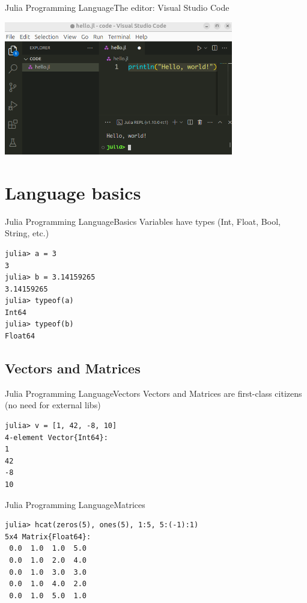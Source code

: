 \documentclass[11pt]{beamer}
\begin{document}
\begin{frame}[fragile]{Julia Programming Language}{The editor: Visual Studio Code}
	\begin{center}
		\includegraphics[width=10cm]{images/vscode.png}
	\end{center}
\end{frame}

\section{Language basics}
\begin{frame}[fragile]{Julia Programming Language}{Basics}
Variables have types (Int, Float, Bool, String, etc.)
\begin{lstlisting}
julia> a = 3
3
julia> b = 3.14159265
3.14159265
julia> typeof(a)
Int64
julia> typeof(b)
Float64
\end{lstlisting}
\end{frame}

\subsection{Vectors and Matrices}
\begin{frame}[fragile]{Julia Programming Language}{Vectors}
Vectors and Matrices are first-class citizens (no need for external libs)
\begin{lstlisting}
julia> v = [1, 42, -8, 10]
4-element Vector{Int64}:
1
42
-8
10
\end{lstlisting}
\end{frame}


\begin{frame}[fragile]{Julia Programming Language}{Matrices}
\begin{lstlisting}
julia> hcat(zeros(5), ones(5), 1:5, 5:(-1):1)
5x4 Matrix{Float64}:
 0.0  1.0  1.0  5.0
 0.0  1.0  2.0  4.0
 0.0  1.0  3.0  3.0
 0.0  1.0  4.0  2.0
 0.0  1.0  5.0  1.0
\end{lstlisting}
\end{frame}
\end{document}
